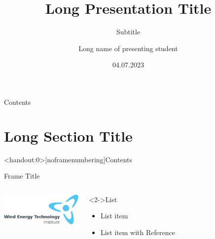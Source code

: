 \documentclass[aspectratio=1610,handout]{beamer} %
\title[Short Presentation Title]{Long Presentation Title}
\institute[WETI]{Wind Energy Technology Institute}
\author[Short name]{Long name of presenting student}
\date{04.07.2023}
\subtitle{Subtitle}
\begin{document}
\maketitle
\section[Introduction]{}
\begin{frame}{Contents}
	\tableofcontents
\end{frame}
\section[Short Section Title]{Long Section Title}
\miniframesoff
\begin{frame}<handout:0>[noframenumbering]{Contents}
	\tableofcontents[currentsection]
\end{frame}
\miniframeson
\begin{frame}{Frame Title}
\begin{columns}
	\column{4.0cm}    	
		\centering 
		\includegraphics<1->[width=4cm]{Figures/WETI}
	\column{10.0cm}
		\begin{block}<2->{List}
			\begin{itemize}		
				\item List item
				\item List item with Reference \cite{Bossanyi2000a}
			\end{itemize} 	
		\end{block}  
\end{columns}
\end{frame}
\end{document}
